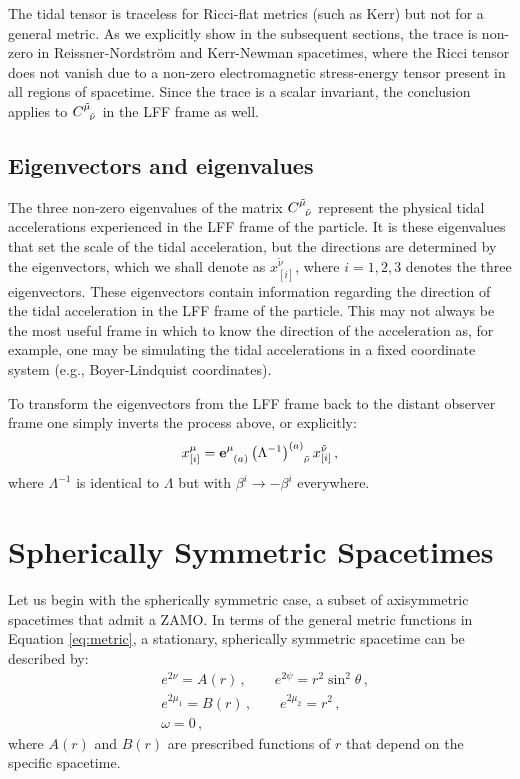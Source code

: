 \documentclass[
    reprint,
    prd,
    nofootinbib,
    amsmath,amssymb,
    aps,
    floatfix,
]{revtex4-2}
\begin{document}
The tidal tensor is traceless for Ricci-flat metrics (such as Kerr) but not for a general metric. As we explicitly show in the subsequent sections, the trace is non-zero in Reissner-Nordström and Kerr-Newman spacetimes, where the Ricci tensor does not vanish due to a non-zero electromagnetic stress-energy tensor present in all regions of spacetime. Since the trace is a scalar invariant, the conclusion applies to $\tensor{C}{^{\tilde{\mu}}_{\tilde{\nu}}}$ in the LFF frame as well.

\subsection{Eigenvectors and eigenvalues}

The three non-zero eigenvalues of the matrix $\tensor{C}{^{\tilde{\mu}}_{\tilde{\nu}}}$ represent the physical tidal accelerations experienced in the LFF frame of the particle. It is these eigenvalues that set the scale of the tidal acceleration, but the directions are determined by the eigenvectors, which we shall denote as $x^{\tilde{\nu}}_{[i]}$, where $i = 1, 2, 3$ denotes the three eigenvectors. These eigenvectors contain information regarding the direction of the tidal acceleration in the LFF frame of the particle. This may not always be the most useful frame in which to know the direction of the acceleration as, for example, one may be simulating the tidal accelerations in a fixed coordinate system (e.g., Boyer-Lindquist coordinates). 

To transform the eigenvectors from the LFF frame back to the distant observer frame one simply inverts the process above, or explicitly:
\begin{equation}
    x_{[i]}^\mu = \tensor{\mathbf{e}}{^\mu_{(a)}} \tensor{\left(\Lambda^{-1}\right)}{^{(a)}_{\tilde \nu}} x^{\tilde \nu}_{[i]} \, ,
\end{equation}
where $\Lambda^{-1}$ is identical to $\Lambda$ but with $\beta^{i} \to -\beta^{i}$ everywhere.


\section{Spherically Symmetric Spacetimes} \label{sec:spherical}


Let us begin with the spherically symmetric case, a subset of axisymmetric spacetimes that admit a ZAMO. In terms of the general metric functions in Equation \ref{eq:metric}, a stationary, spherically symmetric spacetime can be described by:
\begin{equation} \label{eq:spherical_metric}
    \begin{split}
        &e^{2\nu} = A(r) \, , \qquad e^{2\psi} = r^{2} \sin^{2}{\theta} \, , \\
        &e^{2\mu_{1}} = B(r) \, , \qquad e^{2\mu_{2}} = r^{2} \, , \\
        &\omega = 0 \, ,
    \end{split}
\end{equation}
where $A(r)$ and $B(r)$ are prescribed functions of $r$ that depend on the specific spacetime.
\end{document}
